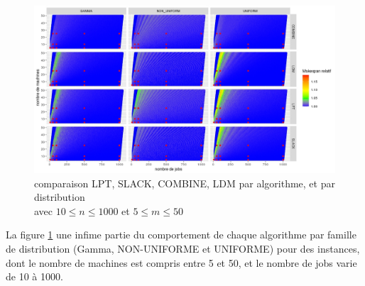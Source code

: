 \documentclass[a4paper,12pt]{report}
\theoremstyle{plain}				%
\theoremstyle{definition}				%
\newcommand{\lp}[1]{\todo[author=LP,color=yellow,inline]{#1}}
\begin{document}
\begin{figure}
{\centering
\includegraphics[width=\columnwidth]{9_resultatComparaisonAlgoDistributions.jpeg}
\caption{comparaison LPT, SLACK, COMBINE, LDM par algorithme, et par distribution\\
\hspace{\linewidth} avec $10\leq n \leq 1000$ et $5\leq m \leq 50$}
\label{fig:resultatComparaisonAlgoDistributions}
\par}
\end{figure}

La figure \ref{fig:resultatComparaisonAlgoDistributions} \lp{verbe ?} une infime partie 
  du comportement de chaque algorithme par famille de distribution 
  (Gamma, NON-UNIFORME et UNIFORME) 
  pour des instances, dont le nombre de machines est compris entre 5 et 50, 
  et le nombre de jobs varie de 10 à 1000. 
\end{document}
